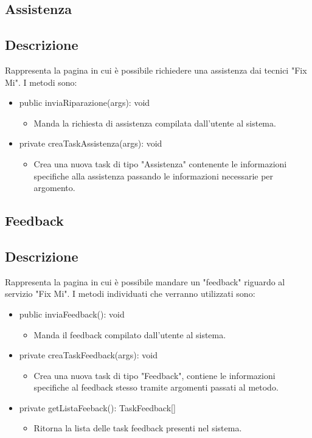 \documentclass{report}
\begin{document}
\subsection*{Assistenza}
\subsection*{Descrizione}
Rappresenta la pagina in cui è possibile richiedere una assistenza dai tecnici "Fix Mi". I metodi sono:
\begin{itemize}
	\item public inviaRiparazione(args): void
	\begin{itemize}
		\item Manda la richiesta di assistenza compilata dall'utente al sistema.
	\end{itemize}
	\item private creaTaskAssistenza(args): void
	\begin{itemize}
		\item Crea una nuova task di tipo "Assistenza" contenente le informazioni specifiche alla assistenza passando le informazioni necessarie per argomento.
	\end{itemize}
\end{itemize}

\subsection*{Feedback}
\subsection*{Descrizione}
Rappresenta la pagina in cui è possibile mandare un "feedback" riguardo al servizio "Fix Mi". I metodi individuati che verranno utilizzati sono:
\begin{itemize}
	\item public inviaFeedback(): void
	\begin{itemize}
		\item Manda il feedback compilato dall'utente al sistema.
	\end{itemize}
	\item private creaTaskFeedback(args): void
	\begin{itemize}
		\item Crea una nuova task di tipo "Feedback", contiene le informazioni specifiche al feedback stesso tramite argomenti passati al metodo.
	\end{itemize}
	\item private getListaFeeback(): TaskFeedback[]
	\begin{itemize}
		\item Ritorna la lista delle task feedback presenti nel sistema.
	\end{itemize}
\end{itemize}
\end{document}
